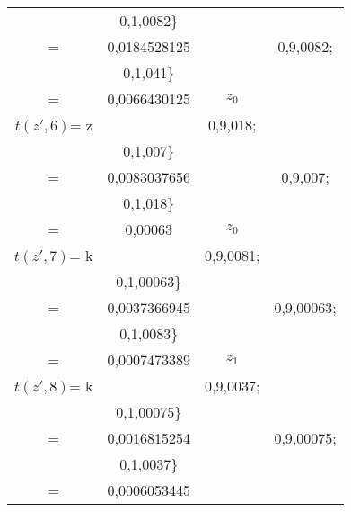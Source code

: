 \begin{center}
\begin{tabular}{cccc}
\begin{array} {r@{}l@{}}
											& 0,1\cdot0,0082\}\\
										   =& 0,0184528125
					\end{array}
					\)
				&   \(	\begin{array} {r@{}l@{}}
							0,9\cdot\max\{	& 0,9\cdot0,0082; \\
											& 0,1\cdot0,041\}\\
										   =& 0,0066430125
					\end{array}
					\) & \(z_{0}\)\\ \hline
\(t(z',6)\)= z	& \(	\begin{array} {r@{}l@{}}
							0,5\cdot\max\{	& 0,9\cdot0,018; \\
											& 0,1\cdot0,007\}\\
										   =& 0,0083037656
					\end{array}
					\)
				&   \(	\begin{array} {r@{}l@{}}
							0,1\cdot\max\{	& 0,9\cdot0,007; \\
											& 0,1\cdot0,018\}\\
										   =& 0,00063
					\end{array}
					\) & \(z_{0}\)\\ \hline
\(t(z',7)\)= k	& \(	\begin{array} {r@{}l@{}}
							0,5\cdot\max\{	& 0,9\cdot0,0081; \\
											& 0,1\cdot0,00063\}\\
										   =& 0,0037366945
					\end{array}
					\)
				&   \(	\begin{array} {r@{}l@{}}
							0,9\cdot\max\{	& 0,9\cdot0,00063; \\
											& 0,1\cdot0,0083\}\\
										   =& 0,0007473389
					\end{array}
					\) & \(z_{1}\)\\ \hline
\(t(z',8)\)= k	& \(	\begin{array} {r@{}l@{}}
							0,5\cdot\max\{	& 0,9\cdot0,0037; \\
											& 0,1\cdot0,00075\}\\
										   =& 0,0016815254
					\end{array}
					\)
				&   \(	\begin{array} {r@{}l@{}}
							0,9\cdot\max\{	& 0,9\cdot0,00075; \\
											& 0,1\cdot0,0037\}\\
										   =& 0,0006053445
					\end{array}

\end{tabular}
\end{center}

